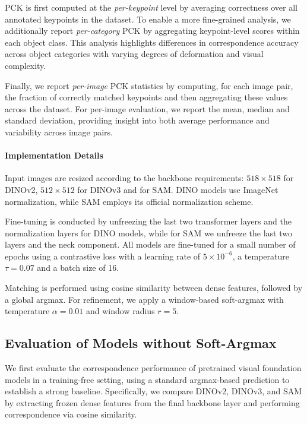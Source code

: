 PCK is first computed at the \emph{per-keypoint} level by averaging correctness over all annotated keypoints in the dataset.
To enable a more fine-grained analysis, we additionally report \emph{per-category} PCK by aggregating keypoint-level scores within each object class.
This analysis highlights differences in correspondence accuracy across object categories with varying degrees of deformation and visual complexity.

Finally, we report \emph{per-image} PCK statistics by computing, for each image pair, the fraction of correctly matched keypoints and then aggregating these values across the dataset.
For per-image evaluation, we report the mean, median and standard deviation, providing insight into both average performance and variability across image pairs.


\paragraph{Implementation Details}

Input images are resized according to the backbone requirements: $518\times518$ for DINOv2, $512\times512$ for DINOv3 and for SAM.
DINO models use ImageNet normalization, while SAM employs its official normalization scheme.

Fine-tuning is conducted by unfreezing the last two transformer layers and the normalization layers for DINO models, while for SAM we unfreeze the last two layers and the neck component.
All models are fine-tuned for a small number of epochs using a contrastive loss with a learning rate of $5\times10^{-6}$, a temperature $\tau = 0.07$ and a batch size of 16.

Matching is performed using cosine similarity between dense features, followed by a global argmax.
For refinement, we apply a window-based soft-argmax with temperature $\alpha=0.01$ and window radius $r=5$.




\subsection{Evaluation of Models without Soft-Argmax}

We first evaluate the correspondence performance of pretrained visual foundation models in a training-free setting, using a standard argmax-based
prediction to establish a strong baseline. Specifically, we compare DINOv2, DINOv3, and SAM by extracting frozen dense features from the final backbone
layer and performing correspondence via cosine similarity.


